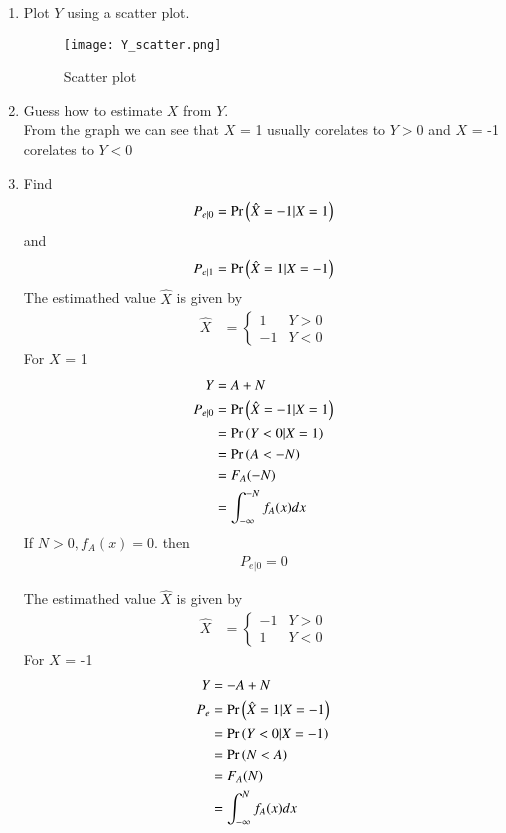 \documentclass[journal,12pt,twocolumn]{IEEEtran}
\renewcommand\thesection{\arabic{section}}
\begin{document}
\begin{enumerate}[label=\thesection.\arabic*
,ref=\thesection.\theenumi]
\item Plot $Y$ using a scatter plot.\\
\solution
\begin{figure}[h]
    \centering
    \texttt{[image: Y\_scatter.png]}
    \caption{Scatter plot}
    \label{fig:Y_scatter}
\end{figure}
\item Guess how to estimate $X$ from $Y$.\\
\solution
 From the graph we can see that $X$ = 1 usually corelates to $Y > 0$ and $X$ = -1 corelates to $Y < 0$
 \item
\label{ml-ch4_sim}
Find 
\begin{equation}
	P_{e|0} = \Pr\left(\hat{X} = -1|X=1\right)
\end{equation}
and 
\begin{equation}
	P_{e|1} = \Pr\left(\hat{X} = 1|X=-1\right)
\end{equation}
%
\solution    The estimathed value $\hat{X}$ is given by 
\begin{align}
    \hat{X} &=
    \begin{cases}
        1  &Y>0
        \\
        -1 &Y<0
    \end{cases}
\end{align}
For $X$ = 1
\begin{align}
    Y &= A + N \\
    P_{e|0} &= \Pr\left(\hat{X} = -1|X=1\right)\\
    &=\Pr\left(Y<0|X=1\right) \\
    &=\Pr\left(A < -N\right) \\
    &= F_A(-N)\\
    &= \int_{-\infty}^{-N}f_A(x)dx
\end{align}
If $N > 0, f_A(x) = 0$. then 
\begin{align}
    P_{e|0} = 0
\end{align}

  The estimathed value $\hat{X}$ is given by 
\begin{align}
    \hat{X} &=
    \begin{cases}
        -1  &Y>0
        \\
        1 &Y<0
    \end{cases}
\end{align}
For $X$ = -1
\begin{align}
    Y &= -A + N \\
    P_e &= \Pr\left(\hat{X} = 1|X=-1\right)\\
    &=\Pr\left(Y<0|X=-1\right) \\
    &=\Pr\left(N < A\right) \\
    &= F_A(N)\\
    &= \int_{-\infty}^{N}f_A(x)dx
\end{align}


\end{enumerate}
\end{document}
